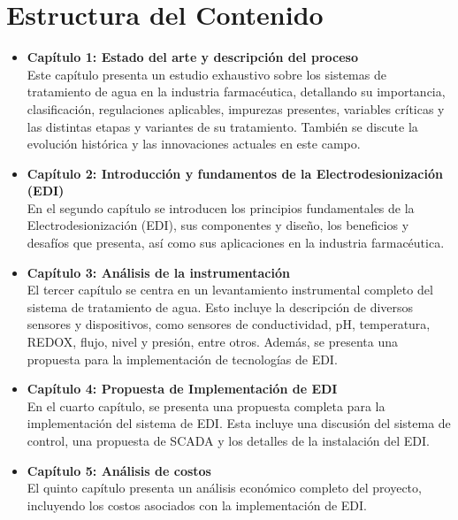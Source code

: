 \section*{Estructura del Contenido}

\begin{itemize}

    \item \textbf{Capítulo 1: Estado del arte y descripción del proceso} \\ Este capítulo presenta un estudio exhaustivo sobre los sistemas de tratamiento de agua en la industria farmacéutica, detallando su importancia, clasificación, regulaciones aplicables, impurezas presentes, variables críticas y las distintas etapas y variantes de su tratamiento. También se discute la evolución histórica y las innovaciones actuales en este campo.

    \item \textbf{Capítulo 2: Introducción y fundamentos de la Electrodesionización (EDI)} \\ En el segundo capítulo se introducen los principios fundamentales de la Electrodesionización (EDI), sus componentes y diseño, los beneficios y desafíos que presenta, así como sus aplicaciones en la industria farmacéutica.

    \item \textbf{Capítulo 3: Análisis de la instrumentación} \\ El tercer capítulo se centra en un levantamiento instrumental completo del sistema de tratamiento de agua. Esto incluye la descripción de diversos sensores y dispositivos, como sensores de conductividad, pH, temperatura, REDOX, flujo, nivel y presión, entre otros. Además, se presenta una propuesta para la implementación de tecnologías de EDI.

    \item \textbf{Capítulo 4: Propuesta de Implementación de EDI} \\ En el cuarto capítulo, se presenta una propuesta completa para la implementación del sistema de EDI. Esta incluye una discusión del sistema de control, una propuesta de SCADA y los detalles de la instalación del EDI.

    \item \textbf{Capítulo 5: Análisis de costos} \\ El quinto capítulo presenta un análisis económico completo del proyecto, incluyendo los costos asociados con la implementación de EDI.

\end{itemize}

